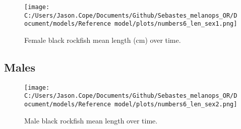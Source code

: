 \documentclass[11pt,
  english,
  letterpaper,
]{article}
\begin{document}
\begin{figure}
\centering
\texttt{[image: C:/Users/Jason.Cope/Documents/Github/Sebastes\_melanops\_OR/Document/models/Reference model/plots/numbers6\_len\_sex1.png]}
\caption{Female black rockfish mean length (cm) over time.\label{fig:num_lts_females}}
\end{figure}

\clearpage

\hypertarget{males-1}{%
\subsection{Males}\label{males-1}}

\begin{figure}
\centering
\texttt{[image: C:/Users/Jason.Cope/Documents/Github/Sebastes\_melanops\_OR/Document/models/Reference model/plots/numbers6\_len\_sex2.png]}
\caption{Male black rockfish mean length over time.\label{fig:num_lts_males}}
\end{figure}

\clearpage
\end{document}
